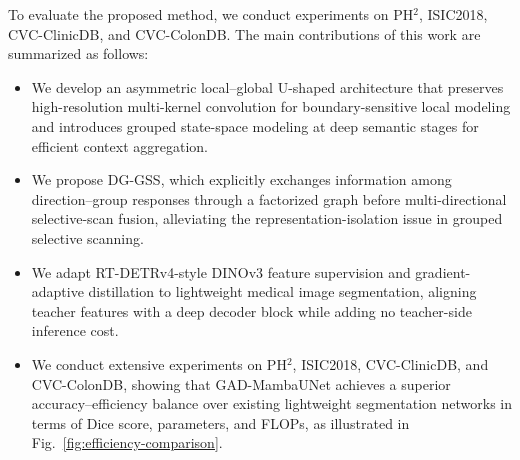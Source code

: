 To evaluate the proposed method, we conduct experiments on PH$^2$, ISIC2018, CVC-ClinicDB, and CVC-ColonDB. The main contributions of this work are summarized as follows:

\begin{itemize}
\item We develop an asymmetric local--global U-shaped architecture that preserves high-resolution multi-kernel convolution for boundary-sensitive local modeling and introduces grouped state-space modeling at deep semantic stages for efficient context aggregation.

\item We propose DG-GSS, which explicitly exchanges information among direction--group responses through a factorized graph before multi-directional selective-scan fusion, alleviating the representation-isolation issue in grouped selective scanning.

\item We adapt RT-DETRv4-style DINOv3 feature supervision and gradient-adaptive distillation to lightweight medical image segmentation, aligning teacher features with a deep decoder block while adding no teacher-side inference cost.

\item We conduct extensive experiments on PH$^2$, ISIC2018, CVC-ClinicDB, and CVC-ColonDB, showing that GAD-MambaUNet achieves a superior accuracy--efficiency balance over existing lightweight segmentation networks in terms of Dice score, parameters, and FLOPs, as illustrated in Fig.~\ref{fig:efficiency-comparison}.
\end{itemize}




